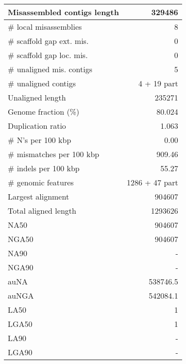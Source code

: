 \documentclass[12pt,a4paper]{article}
\begin{document}
\begin{table}[ht]
\begin{center}
\begin{tabular}{|l*{1}{|r}|}
Misassembled contigs length & 329486 \\ \hline
\# local misassemblies & 8 \\ \hline
\# scaffold gap ext. mis. & 0 \\ \hline
\# scaffold gap loc. mis. & 0 \\ \hline
\# unaligned mis. contigs & 5 \\ \hline
\# unaligned contigs & 4 + 19 part \\ \hline
Unaligned length & 235271 \\ \hline
Genome fraction (\%) & 80.024 \\ \hline
Duplication ratio & 1.063 \\ \hline
\# N's per 100 kbp & 0.00 \\ \hline
\# mismatches per 100 kbp & 909.46 \\ \hline
\# indels per 100 kbp & 55.27 \\ \hline
\# genomic features & 1286 + 47 part \\ \hline
Largest alignment & 904607 \\ \hline
Total aligned length & 1293626 \\ \hline
NA50 & 904607 \\ \hline
NGA50 & 904607 \\ \hline
NA90 & - \\ \hline
NGA90 & - \\ \hline
auNA & 538746.5 \\ \hline
auNGA & 542084.1 \\ \hline
LA50 & 1 \\ \hline
LGA50 & 1 \\ \hline
LA90 & - \\ \hline
LGA90 & - \\ \hline
\end{tabular}
\end{center}
\end{table}
\end{document}
